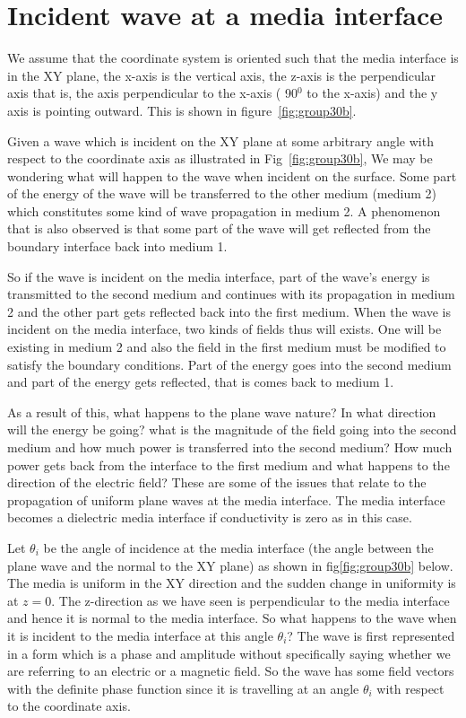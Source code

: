 \section{Incident wave at a media interface}
We assume that the coordinate system is oriented such that the media interface is in the XY plane, the x-axis is the vertical axis, the z-axis is the perpendicular axis that is, the axis perpendicular to the x-axis ( 90$^{0}$ to the x-axis) and the y axis is pointing outward. This is shown in figure~\ref{fig:group30b}.

Given a wave which is incident on the XY plane at some arbitrary angle with respect to the coordinate axis as illustrated in Fig~\ref{fig:group30b}, We may be wondering what will happen to the wave when incident on the surface. Some part of the energy of the wave will be transferred to the other medium (medium 2) which constitutes some kind of wave propagation in medium 2. A phenomenon that is also observed is that some part of the wave will get reflected from the boundary interface back into medium 1.

So if the wave is incident on the media interface, part of the wave's energy is transmitted to the second medium and continues with its propagation in medium 2 and the other part gets reflected back into the first medium. When the wave is incident on the media interface, two kinds of fields thus will exists. One will be existing in medium 2 and also the field in the first medium must be modified to satisfy the boundary conditions. Part of the energy goes into the second medium and part of the energy gets reflected, that is comes back to medium 1.

As a result of this, what happens to the plane wave nature? In what direction will the energy be going? what is the magnitude of the field going into the second medium and how much power is transferred into the second medium? How much power gets back from the interface to the first medium and what happens to the direction of the electric field? These are some of the issues that relate to the propagation of uniform plane waves at the media interface. The media interface becomes a dielectric media interface if conductivity is zero as in this case.

Let $\theta_i$ be the angle of incidence at the media interface (the angle between the plane wave and the normal to the XY plane) as shown in fig\ref{fig:group30b} below. The media is uniform in the XY direction and the sudden change in uniformity is at $z=0$. The z-direction as we have seen is perpendicular to the media interface and hence it is normal to the media interface. So what happens to the wave when it is incident to the media interface at this angle $\theta_i$? The wave is first represented in a form which is a phase and amplitude without specifically saying whether we are referring to an electric or a magnetic field. So the wave has some field vectors with the definite phase function since it is travelling at an angle $\theta_i$ with respect to the coordinate axis.	


